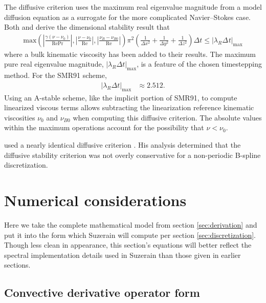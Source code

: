 \documentclass[letterpaper,11pt,nointlimits,reqno,draft]{amsart}
\begin{document}
The diffusive criterion uses the maximum real eigenvalue magnitude from a model
diffusion equation as a surrogate for the more complicated Navier--Stokes case.
Both \citet[equation~2.40]{Kwok2002} and \citet[equations~4.29--30]{Guarini1998}
derive the dimensional stability result that
\begin{align}\label{eq:diffusivestability}
    \mbox{max}\!\left(
      \left|\frac{\gamma\left(\nu-\nu_{0}\right)}{\mbox{Re}\mbox{Pr}}\right|,
      \left|\frac{\nu-\nu_{0}}{\mbox{Re}}\right|,
      \left|\frac{\nu_{B}-\nu_{B0}}{\mbox{Re}}\right|
    \right)
    \pi^{2}
    \left(
        \frac{1}{\Delta{}x^{2}}
      + \frac{1}{\Delta{}y^{2}}
      + \frac{1}{\Delta{}z^{2}}
    \right)
    \Delta{}t \leq \left|\lambda_{R}\Delta_{}t\right|_{\mbox{max}}
\end{align}
where a bulk kinematic viscosity has been added to their results.  The maximum
pure real eigenvalue magnitude,
$\left|\lambda_{R}\Delta{}t\right|_{\mbox{max}}$, is a feature of the chosen
timestepping method.  For the SMR91 scheme,
\begin{align}
\left|\lambda_{R}\Delta{}t\right|_{\mbox{max}} &\approx 2.512.
\end{align}
Using an A-stable scheme, like the implicit portion of SMR91, to compute
linearized viscous terms allows subtracting the linearization reference
kinematic viscosities $\nu_0$ and $\nu_{B0}$ when computing this diffusive
criterion.  The absolute values within the maximum operations account for the
possibility that $\nu<\nu_{0}$.

\citeauthor{Venugopal2003} used a nearly identical diffusive criterion
\citep[equation~3.15]{Venugopal2003}.  His analysis determined that the
diffusive stability criterion was not overly conservative for a non-periodic
B-spline discretization.

\section{Numerical considerations}

Here we take the complete mathematical model from section \ref{sec:derivation}
and put it into the form which Suzerain will compute per section
\ref{sec:discretization}.  Though less clean in appearance, this section's
equations will better reflect the spectral implementation details used in
Suzerain than those given in earlier sections.

\subsection{Convective derivative operator form}
\end{document}
